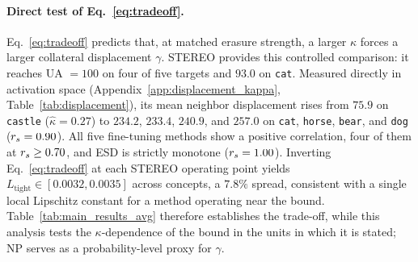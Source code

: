 \paragraph{Direct test of Eq.~\eqref{eq:tradeoff}.} Eq.~\eqref{eq:tradeoff} predicts that, at matched erasure strength, a larger $\kappa$ forces a larger collateral displacement $\gamma$. STEREO provides this controlled comparison: it reaches UA $=100$ on four of five targets and $93.0$ on \texttt{cat}. Measured directly in activation space (Appendix~\ref{app:displacement_kappa}, Table~\ref{tab:displacement}), its mean neighbor displacement rises from $75.9$ on \texttt{castle} ($\hat\kappa=0.27$) to $234.2$, $233.4$, $240.9$, and $257.0$ on \texttt{cat}, \texttt{horse}, \texttt{bear}, and \texttt{dog} ($r_s=0.90$). All five fine-tuning methods show a positive correlation, four of them at $r_s\geq0.70$, and ESD is strictly monotone ($r_s=1.00$). Inverting Eq.~\eqref{eq:tradeoff} at each STEREO operating point yields $L_{\text{tight}}\in[0.0032,0.0035]$ across concepts, a $7.8\%$ spread, consistent with a single local Lipschitz constant for a method operating near the bound. Table~\ref{tab:main_results_avg} therefore establishes the trade-off, while this analysis tests the $\kappa$-dependence of the bound in the units in which it is stated; NP serves as a probability-level proxy for $\gamma$.

